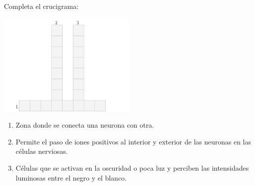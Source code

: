 Completa el crucigrama:
\begin{center}
    \includegraphics[width=0.5\textwidth]{Images/SINFI_U3_AC79_IMG1.png}
\end{center}

\begin{enumerate}
    \item Zona donde se conecta una neurona con otra.
    \item Permite el paso de iones positivos al interior y exterior de las neuronas en las células nerviosas.
    \item Células que se activan en la oscuridad o poca luz y perciben las intensidades luminosas entre el negro y el blanco.
\end{enumerate}